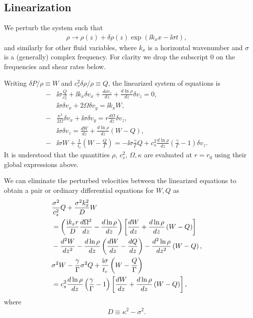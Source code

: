  \subsection{Linearization}
 We perturb the system such that
 \begin{align}
   \rho \to \rho(z) + \delta\rho(z)\exp{\left(\ii k_x x - \ii\sigma
       t\right)},    
 \end{align}
 and similarly for other fluid variables, where $k_x$ is a horizontal
 wavenumber and $\sigma$ is a (generally) complex frequency. For
 clarity we drop the subscript $0$ on the frequencies and shear rates
 below. 
 
 Writing $\delta P /\rho \equiv W$ and $c_s^2\delta\rho/\rho\equiv Q$, 
 the linearized system of equations is 
 \begin{align}
   -&\ii\sigma \frac{Q}{c_s^2} + \ii k_x \delta v_x + \frac{d\dd
     v_z}{dz} + \frac{d\ln{\rho}}{dz}\delta v_z = 0,\\
   &\ii\sigma \delta v_x + 2\Omega\delta v_y = \ii k_x W,\\
   -&\frac{\kappa^2}{2\Omega}\delta v_x + \ii \sigma\delta v_y =
   r\frac{d\Omega}{dz}\delta v_z, \\
   & \ii\sigma\delta v_z = \frac{dW}{dz} +
   \frac{d\ln{\rho}}{dz}\left(W-Q\right), \\
   -&\ii\sigma W + \frac{1}{t_c}\left(W-\frac{Q}{\Gamma}\right) = -\ii\sigma\frac{\gamma}{\Gamma} Q +
   c_s^2\frac{d\ln{\rho}}{dz}\left(\frac{\gamma}{\Gamma}-1\right)\delta v_z.
 \end{align}
It is understood that the quantities $\rho,\,c_s^2,\,\Omega,\kappa$
are evaluated at $r=r_0$ using their global expressions above.  

We can eliminate the perturbed velocities between the linearized
equations to obtain a pair or ordinary differential equations
for $W,Q$ as
\begin{align}
  &\frac{\sigma^2}{c_s^2}Q + \frac{\sigma^2k_x^2}{D}W \notag\\ 
  &=\left(\frac{\mathrm{i}
    k_x r}{D}\frac{d\Omega^2}{dz} -
  \frac{d\ln{\rho}}{dz}\right)\left[\frac{dW}{dz} +
  \frac{d\ln{\rho}}{dz}\left(W-Q\right)\right] \notag\\
&- \frac{d^2W}{dz^2} - \frac{d\ln{\rho}}{dz}\left(\frac{dW}{dz} -
  \frac{dQ}{dz}\right) - \frac{d^2\ln{\rho}}{dz^2}\left(W-Q\right),\label{ode_w}\\
&\sigma^2W - \frac{\gamma}{\Gamma}\sigma^2 Q +
\frac{\mathrm{i}\sigma}{t_c}\left(W-\frac{Q}{\Gamma}\right)\notag\\
&=c_s^2\frac{d\ln{\rho}}{dz}\left(\frac{\gamma}{\Gamma} - 1\right) 
\left[\frac{dW}{dz} + \frac{d\ln{\rho}}{dz}\left(W-Q\right)\right],\label{ode_Q} 
\end{align}
where
\begin{align}
  D \equiv \kappa^2 - \sigma^2.
\end{align}

